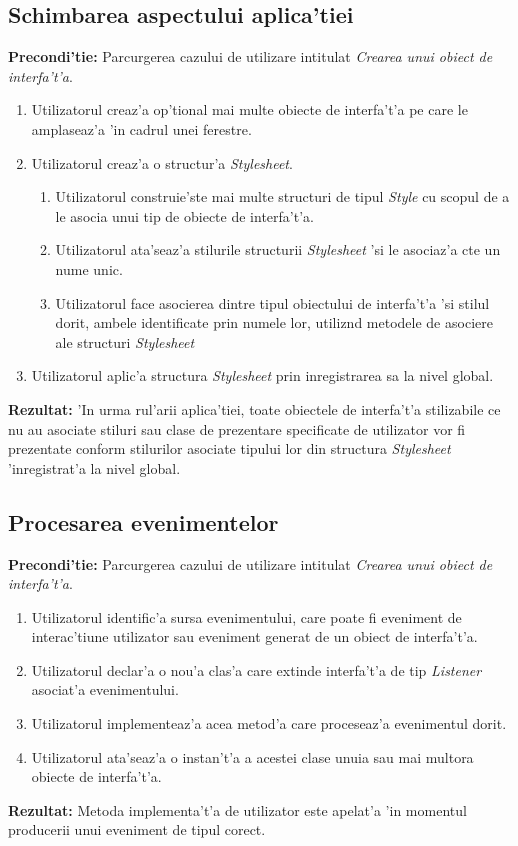 \subsection{Schimbarea aspectului aplica'tiei}
\textbf{Precondi'tie:} Parcurgerea cazului de utilizare intitulat \emph{Crearea unui obiect de interfa't'a}.
\begin{enumerate}
\item Utilizatorul creaz'a op'tional mai multe obiecte de interfa't'a pe care le amplaseaz'a 'in cadrul unei ferestre.
\item Utilizatorul creaz'a o structur'a \emph{Stylesheet}.
\begin{enumerate}
  \item Utilizatorul construie'ste mai multe structuri de tipul \emph{Style} cu scopul de a le asocia unui tip de obiecte de interfa't'a.
  \item Utilizatorul ata'seaz'a stilurile structurii \emph{Stylesheet} 'si le asociaz'a c{\ia}te un nume unic.
  \item Utilizatorul face asocierea dintre tipul obiectului de interfa't'a 'si stilul dorit, ambele identificate prin numele lor, utiliz{\ia}nd metodele de asociere ale structuri \emph{Stylesheet}
\end{enumerate}
\item Utilizatorul aplic'a structura \emph{Stylesheet} prin inregistrarea sa la nivel global.
\end{enumerate}
\textbf{Rezultat:} 'In urma rul'arii aplica'tiei, toate obiectele de interfa't'a stilizabile ce nu au asociate stiluri sau clase de prezentare specificate de utilizator vor fi prezentate conform stilurilor asociate tipului lor din structura \emph{Stylesheet} 'inregistrat'a la nivel global.

\subsection{Procesarea evenimentelor}
\textbf{Precondi'tie:} Parcurgerea cazului de utilizare intitulat \emph{Crearea unui obiect de interfa't'a}.
\begin{enumerate}
\item Utilizatorul identific'a sursa evenimentului, care poate fi eveniment de interac'tiune utilizator sau eveniment generat de un obiect de interfa't'a.
\item Utilizatorul declar'a o nou'a clas'a care extinde interfa't'a de tip \emph{Listener} asociat'a evenimentului.
\item Utilizatorul implementeaz'a acea metod'a care proceseaz'a evenimentul dorit.
\item Utilizatorul ata'seaz'a o instan't'a a acestei clase unuia sau mai multora obiecte de interfa't'a.
\end{enumerate}
\textbf{Rezultat:} Metoda implementa't'a de utilizator este apelat'a 'in momentul producerii unui eveniment de tipul corect.

